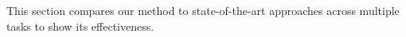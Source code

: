 

This section compares our method to state-of-the-art approaches across multiple tasks to show its effectiveness.




